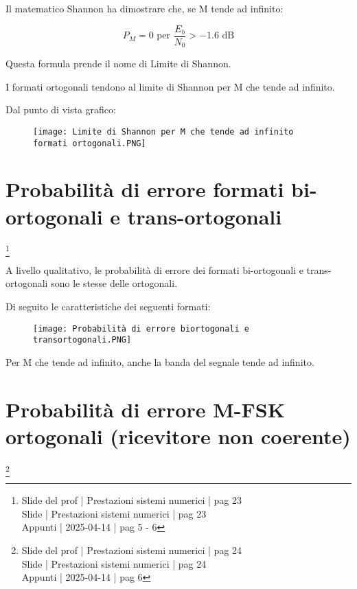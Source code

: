 Il matematico Shannon ha dimostrare che, se M tende ad infinito: 

{
    \Large 
    \begin{equation}
        P_M = 0 \text{ per } \frac{E_b}{N_0} > - 1.6 \text{ dB}
    \end{equation}
}

Questa formula prende il nome di Limite di Shannon. \newline 

I formati ortogonali tendono al limite di Shannon per M che tende ad infinito. \newline 

Dal punto di vista grafico: 

\begin{figure}[h]
    \centering
    \texttt{[image: Limite di Shannon per M che tende ad infinito formati ortogonali.PNG]}
\end{figure}

\newpage 

\section{Probabilità di errore formati bi-ortogonali e trans-ortogonali}
\footnote{Slide del prof | Prestazioni sistemi numerici | pag 23 \\
Slide | Prestazioni sistemi numerici | pag 23 \\
Appunti | 2025-04-14 | pag 5 - 6
}

A livello qualitativo, le probabilità di errore dei formati bi-ortogonali e trans-ortogonali sono le stesse delle ortogonali. \newline 

Di seguito le caratteristiche dei seguenti formati: 

\begin{figure}[h]
    \centering
    \texttt{[image: Probabilità di errore biortogonali e transortogonali.PNG]}
\end{figure}

Per M che tende ad infinito, anche la banda del segnale tende ad infinito. \newline 

\newpage 

\section{Probabilità di errore M-FSK ortogonali (ricevitore non coerente)}
\footnote{Slide del prof | Prestazioni sistemi numerici | pag 24 \\
Slide | Prestazioni sistemi numerici | pag 24 \\
Appunti | 2025-04-14 | pag 6
}

